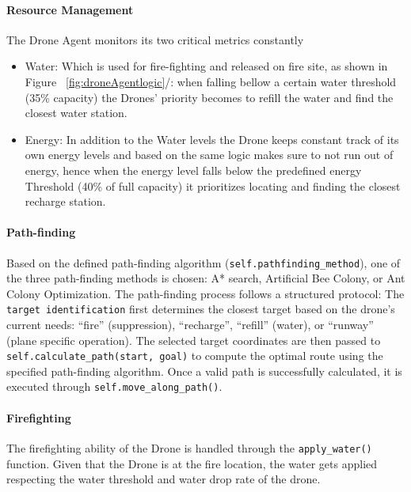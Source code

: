 \documentclass[twoside]{article}
\begin{document}
\paragraph{Resource Management} The Drone Agent monitors its two critical metrics constantly
\begin{itemize}
  \item {Water:} Which is used for fire-fighting and released on fire site, as shown in Figure ~\ref{fig:droneAgentlogic}/: when falling bellow a certain water threshold (35\% capacity) the Drones' priority becomes to refill the water and find the closest water station.
  \item {Energy:} In addition to the Water levels the Drone keeps constant track of its own energy levels and based on the same logic makes sure to not run out of energy, hence when the energy level falls below the predefined energy Threshold (40\% of full capacity) it prioritizes locating and finding the closest recharge station.
\end{itemize}


\paragraph{Path-finding} Based on the defined path-finding algorithm (\texttt{self.pathfinding\_method}), one of the three path-finding methods is chosen: A* search, Artificial Bee Colony, or Ant Colony Optimization. The path-finding process follows a structured protocol: The \texttt{target identification} first determines the closest target based on the drone's current needs: ``fire'' (suppression), ``recharge'', ``refill'' (water), or ``runway'' (plane specific operation). The selected target coordinates are then passed to \texttt{self.calculate\_path(start, goal)} to compute the optimal route using the specified path-finding algorithm. Once a valid path is successfully calculated, it is executed through \texttt{self.move\_along\_path()}.

\paragraph{Firefighting} The firefighting ability of the Drone is handled through the \texttt{apply\_water()} function. Given that the Drone is at the fire location, the water gets applied respecting the water threshold and water drop rate of the drone.
\end{document}
